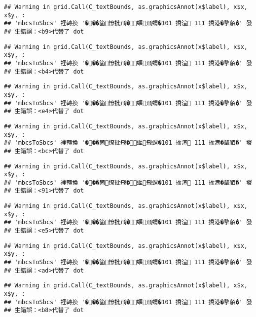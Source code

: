 \documentclass[
]{article}
\begin{document}
\begin{verbatim}
## Warning in grid.Call(C_textBounds, as.graphicsAnnot(x$label), x$x, x$y, :
## 'mbcsToSbcs' 裡轉換 '���箇憭批飛�蝘飛蝟�101 撟渲 111 撟港�摮貊�' 發
## 生錯誤：<b9>代替了 dot
\end{verbatim}

\begin{verbatim}
## Warning in grid.Call(C_textBounds, as.graphicsAnnot(x$label), x$x, x$y, :
## 'mbcsToSbcs' 裡轉換 '���箇憭批飛�蝘飛蝟�101 撟渲 111 撟港�摮貊�' 發
## 生錯誤：<b4>代替了 dot
\end{verbatim}

\begin{verbatim}
## Warning in grid.Call(C_textBounds, as.graphicsAnnot(x$label), x$x, x$y, :
## 'mbcsToSbcs' 裡轉換 '���箇憭批飛�蝘飛蝟�101 撟渲 111 撟港�摮貊�' 發
## 生錯誤：<e4>代替了 dot
\end{verbatim}

\begin{verbatim}
## Warning in grid.Call(C_textBounds, as.graphicsAnnot(x$label), x$x, x$y, :
## 'mbcsToSbcs' 裡轉換 '���箇憭批飛�蝘飛蝟�101 撟渲 111 撟港�摮貊�' 發
## 生錯誤：<bc>代替了 dot
\end{verbatim}

\begin{verbatim}
## Warning in grid.Call(C_textBounds, as.graphicsAnnot(x$label), x$x, x$y, :
## 'mbcsToSbcs' 裡轉換 '���箇憭批飛�蝘飛蝟�101 撟渲 111 撟港�摮貊�' 發
## 生錯誤：<91>代替了 dot
\end{verbatim}

\begin{verbatim}
## Warning in grid.Call(C_textBounds, as.graphicsAnnot(x$label), x$x, x$y, :
## 'mbcsToSbcs' 裡轉換 '���箇憭批飛�蝘飛蝟�101 撟渲 111 撟港�摮貊�' 發
## 生錯誤：<e5>代替了 dot
\end{verbatim}

\begin{verbatim}
## Warning in grid.Call(C_textBounds, as.graphicsAnnot(x$label), x$x, x$y, :
## 'mbcsToSbcs' 裡轉換 '���箇憭批飛�蝘飛蝟�101 撟渲 111 撟港�摮貊�' 發
## 生錯誤：<ad>代替了 dot
\end{verbatim}

\begin{verbatim}
## Warning in grid.Call(C_textBounds, as.graphicsAnnot(x$label), x$x, x$y, :
## 'mbcsToSbcs' 裡轉換 '���箇憭批飛�蝘飛蝟�101 撟渲 111 撟港�摮貊�' 發
## 生錯誤：<b8>代替了 dot
\end{verbatim}
\end{document}
